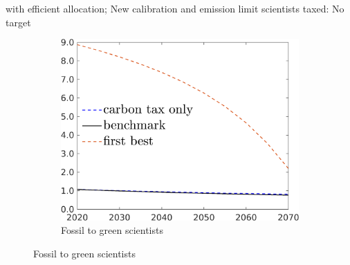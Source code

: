 \documentclass[11pt,aspectratio=169]{beamer}
\begin{document}
\begin{frame}{with efficient allocation; New calibration and emission limit scientists taxed: No target}
\begin{figure}[h!!]
\begin{subfigure}{0.3\textwidth}
		\end{subfigure}
		\begin{subfigure}{0.3\textwidth}		
			\caption{{Fossil to green scientists}}
			\includegraphics[width=1\textwidth]{../codding_model/own_basedOnFried/optimalPol_010922_revision/figures/all_13Sept22/NewCalib_eff2pol_NoT_sffsg_Sun2_emnet1_spillover0_knspil3_xgr0_nsk0_sep0_extern0_PV1_etaa0.79_lgd1.png}
		\end{subfigure}
	\end{figure}
\end{frame}
\end{document}
